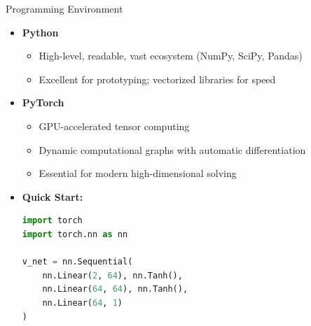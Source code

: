 \documentclass[10pt,english,aspectratio=169]{beamer}
\begin{document}
\begin{frame}[fragile]{Programming Environment}
\begin{itemize}
\item \textbf{Python}
\begin{itemize}
    \item High-level, readable, vast ecosystem (NumPy, SciPy, Pandas)
    \item Excellent for prototyping; vectorized libraries for speed
\end{itemize}

\medskip
\item \textbf{PyTorch}
\begin{itemize}
    \item GPU-accelerated tensor computing
    \item Dynamic computational graphs with automatic differentiation
    \item Essential for modern high-dimensional solving
\end{itemize}

\medskip
\item \textbf{Quick Start:}
\begin{lstlisting}[language=Python]
import torch
import torch.nn as nn

v_net = nn.Sequential(
    nn.Linear(2, 64), nn.Tanh(),
    nn.Linear(64, 64), nn.Tanh(),
    nn.Linear(64, 1)
)
\end{lstlisting}
\end{itemize}
\end{frame}

\end{document}
